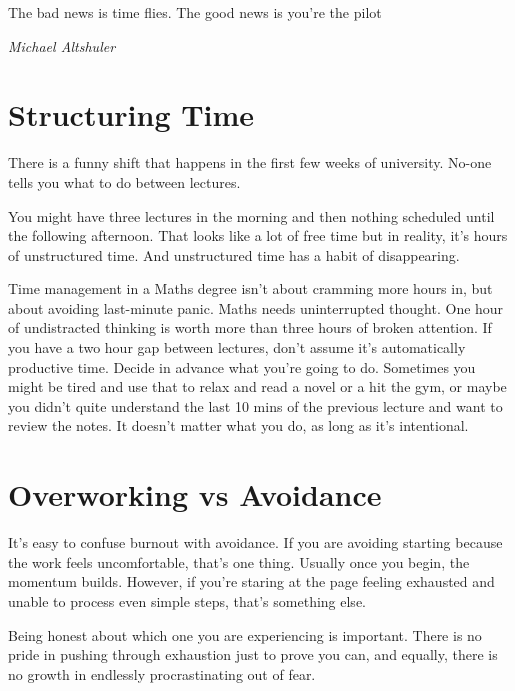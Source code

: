 \epigraph{The bad news is time flies. The good news is you're the pilot}
{\textit{Michael Altshuler}}






\section{Structuring Time}

There is a funny shift that happens in the first few weeks of university. No-one tells you what to do between lectures. 

You might have three lectures in the morning and then nothing scheduled until the following afternoon. That looks like a lot of free time but in reality, it's hours of unstructured time. And unstructured time has a habit of disappearing. 

Time management in a Maths degree isn’t about cramming more hours in, but about avoiding last-minute panic. Maths needs uninterrupted thought. One hour of undistracted thinking is worth more than three hours of broken attention. If you have a two hour gap between lectures, don't assume it's automatically productive time. Decide in advance what you're going to do. Sometimes you might be tired and use that to relax and read a novel or a hit the gym, or maybe you didn't quite understand the last 10 mins of the previous lecture and want to review the notes. It doesn't matter what you do, as long as it's intentional. 

\section{Overworking vs Avoidance}

It’s easy to confuse burnout with avoidance. If you are avoiding starting because the work feels uncomfortable, that’s one thing. Usually once you begin, the momentum builds. However, if you're staring at the page feeling exhausted and unable to process even simple steps, that’s something else. 

Being honest about which one you are experiencing is important. There is no pride in pushing through exhaustion just to prove you can, and equally, there is no growth in endlessly procrastinating out of fear.

